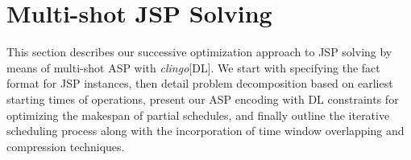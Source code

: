 \documentclass{tlp} %
\newcommand{\clingodl}{\emph{clingo}[DL]\xspace}
\begin{document}
\section{Multi-shot JSP Solving}\label{sec:problem}
This section describes our successive optimization approach to
JSP solving by means of multi-shot ASP with \clingodl.
We start with specifying the fact format for JSP instances,
then detail problem decomposition based on earliest starting times of operations,
present our ASP encoding with DL constraints for optimizing the makespan of partial schedules, and
finally outline the iterative scheduling process 
along with the incorporation of time window overlapping and compression techniques.   
%
\end{document}
